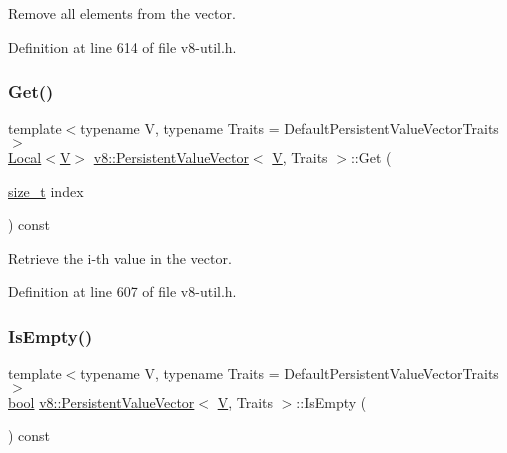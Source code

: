 Remove all elements from the vector. 

Definition at line 614 of file v8-\/util.\+h.

\mbox{\label{classv8_1_1PersistentValueVector_a0788f334c7f61355863244379042ce76}} 
\subsubsection{\texorpdfstring{Get()}{Get()}}
{\footnotesize\ttfamily template$<$typename V, typename Traits = Default\+Persistent\+Value\+Vector\+Traits$>$ \\
\mbox{\hyperlink{classv8_1_1Local}{Local}}$<$\mbox{\hyperlink{classV}{V}}$>$ \mbox{\hyperlink{classv8_1_1PersistentValueVector}{v8\+::\+Persistent\+Value\+Vector}}$<$ \mbox{\hyperlink{classV}{V}}, Traits $>$\+::Get (\begin{DoxyParamCaption}\item[{\mbox{\hyperlink{classsize__t}{size\+\_\+t}}}]{index }\end{DoxyParamCaption}) const\hspace{0.3cm}{\ttfamily [inline]}}

Retrieve the i-\/th value in the vector. 

Definition at line 607 of file v8-\/util.\+h.

\mbox{\label{classv8_1_1PersistentValueVector_aa45dd4d1ee94a2c199a28a0bb2e432f1}} 
\subsubsection{\texorpdfstring{Is\+Empty()}{IsEmpty()}}
{\footnotesize\ttfamily template$<$typename V, typename Traits = Default\+Persistent\+Value\+Vector\+Traits$>$ \\
\mbox{\hyperlink{classbool}{bool}} \mbox{\hyperlink{classv8_1_1PersistentValueVector}{v8\+::\+Persistent\+Value\+Vector}}$<$ \mbox{\hyperlink{classV}{V}}, Traits $>$\+::Is\+Empty (\begin{DoxyParamCaption}{ }\end{DoxyParamCaption}) const\hspace{0.3cm}{\ttfamily [inline]}}

